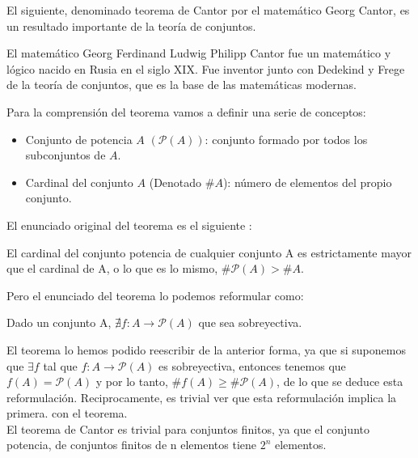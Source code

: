 %
\begin{isabellebody}%
%
%
\isadelimtheory
%
\endisadelimtheory
%
\isatagtheory
%
\endisatagtheory
{\isafoldtheory}%
%
\isadelimtheory
%
\endisadelimtheory
%
\isadelimdocument
%
\endisadelimdocument
%
\isatagdocument
%
\isamarkuptrue%
%
\endisatagdocument
{\isafolddocument}%
%
\isadelimdocument
%
\endisadelimdocument
%
\begin{isamarkuptext}%
El siguiente, denominado  teorema de Cantor por el matemático
 Georg Cantor, es un resultado importante de la teoría
 de conjuntos. 

El matemático Georg Ferdinand Ludwig Philipp Cantor fue un matemático y
lógico nacido en Rusia en el siglo XIX. Fue inventor junto con Dedekind
 y Frege de la teoría de conjuntos, que es la base de las matemáticas
 modernas.



Para la comprensión del teorema vamos a definir una serie de conceptos:

\begin {itemize}

\item Conjunto de potencia $A$  $(\mathcal{P}(A))$: conjunto formado por
todos los subconjuntos de $A$.
\item Cardinal del conjunto $A$ (Denotado $\# A$): número de elementos del propio
 conjunto.

\end {itemize}
El enunciado original del teorema es el siguiente : 


\begin {teorema}
El cardinal del conjunto potencia de cualquier conjunto A es
 estrictamente mayor que el cardinal de A, o lo que es lo mismo,
$\# \mathcal{P}(A) > \# A.$


\end {teorema}
Pero el enunciado del teorema lo podemos reformular como: 
\begin{teorema}
Dado un conjunto A, $\nexists  f : A \longrightarrow \mathcal{P}(A)$ que
sea sobreyectiva.

\end{teorema}

El teorema lo hemos podido reescribir de la anterior forma, ya que si
 suponemos que $\exists f$ tal que $f: A \longrightarrow \mathcal{P}(A)$
es sobreyectiva, entonces tenemos que $f(A) = \mathcal{P}(A)$ y por lo
 tanto, $\# f(A) \geq \# \mathcal{P}(A)$, de lo que se deduce esta
 reformulación. Reciprocamente, es trivial ver que esta reformulación
 implica la primera.
 con el teorema. \\
El teorema de Cantor es trivial para conjuntos finitos, ya que el
 conjunto potencia, de conjuntos finitos de n elementos tiene
 $2^n$ elementos.


\end{isamarkuptext}
\end{isabellebody}
